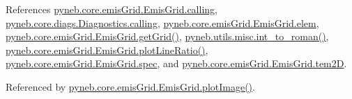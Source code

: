 References \hyperlink{emis_grid_8py_source_l00041}{pyneb.\+core.\+emis\+Grid.\+Emis\+Grid.\+calling}, \hyperlink{diags_8py_source_l00169}{pyneb.\+core.\+diags.\+Diagnostics.\+calling}, \hyperlink{emis_grid_8py_source_l00045}{pyneb.\+core.\+emis\+Grid.\+Emis\+Grid.\+elem}, \hyperlink{emis_grid_8py_source_l00111}{pyneb.\+core.\+emis\+Grid.\+Emis\+Grid.\+get\+Grid()}, \hyperlink{misc_8py_source_l00013}{pyneb.\+utils.\+misc.\+int\+\_\+to\+\_\+roman()}, \hyperlink{emis_grid_8py_source_l00238}{pyneb.\+core.\+emis\+Grid.\+Emis\+Grid.\+plot\+Line\+Ratio()}, \hyperlink{emis_grid_8py_source_l00046}{pyneb.\+core.\+emis\+Grid.\+Emis\+Grid.\+spec}, and \hyperlink{emis_grid_8py_source_l00088}{pyneb.\+core.\+emis\+Grid.\+Emis\+Grid.\+tem2\+D}.



Referenced by \hyperlink{emis_grid_8py_source_l00137}{pyneb.\+core.\+emis\+Grid.\+Emis\+Grid.\+plot\+Image()}.



